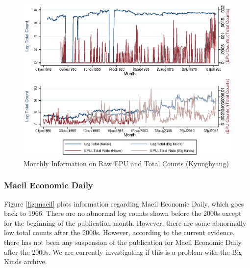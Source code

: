 \begin{landscape}
\begin{figure}[H] \caption{Monthly Information on Raw EPU and Total Counts (Kyunghyang)} \label{fig:kyunghyang}
\begin{center}
\includegraphics[scale=1.45]{../output/plots/plot_kyunghyang_combined.eps} 
\end{center}		
\end{figure}
\end{landscape}


\subsubsection{Maeil Economic Daily}

Figure \ref{fig:maeil} plots information regarding Maeil Economic Daily, which goes back to 1966. There are no abnormal log counts shown before the 2000s except for the beginning of the publication month. However, there are some abnormally low total counts after the 2000s. However, according to the current evidence, there has not been any suspension of the publication for Maeil Economic Daily after the 2000s. We are currently investigating if this is a problem with the Big Kinds archive. 

